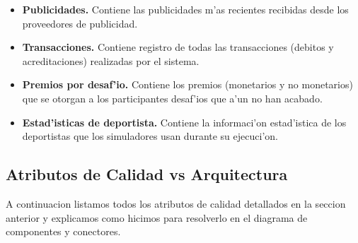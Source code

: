\begin{itemize}
	\item \textbf{Publicidades.} Contiene las publicidades m'as recientes recibidas desde los proveedores de publicidad.
	\item \textbf{Transacciones.} Contiene registro de todas las transacciones (debitos y acreditaciones) realizadas por el sistema.
	\item \textbf{Premios por desaf'io.} Contiene los premios (monetarios y no monetarios) que se otorgan a los participantes desaf'ios que a'un no han acabado.
	\item \textbf{Estad'isticas de deportista.} Contiene la informaci'on estad'istica de los deportistas que los simuladores usan durante su ejecuci'on.
	
\end{itemize}

\subsection{Atributos de Calidad vs Arquitectura}
A continuacion listamos todos los atributos de calidad detallados en la seccion anterior y explicamos como hicimos para resolverlo en el diagrama de componentes y conectores.


